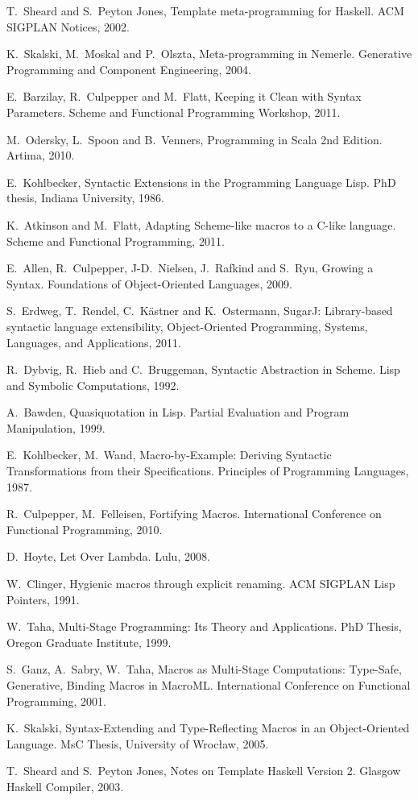 \documentclass[10pt,journal,a4paper]{IEEEtran}
\begin{document}
\begin{thebibliography}{99}

T.~Sheard and S.~Peyton Jones,
Template meta-programming for Haskell.
ACM SIGPLAN Notices, 2002.

K.~Skalski, M.~Moskal and P.~Olszta,
Meta-programming in Nemerle.
Generative Programming and Component Engineering, 2004.

E.~Barzilay, R.~Culpepper and M.~Flatt,
Keeping it Clean with Syntax Parameters.
Scheme and Functional Programming Workshop, 2011.

M.~Odersky, L.~Spoon and B.~Venners,
Programming in Scala 2nd Edition.
Artima, 2010.

E.~Kohlbecker,
Syntactic Extensions in the Programming Language Lisp.
PhD thesis, Indiana University, 1986.

K.~Atkinson and M.~Flatt,
Adapting Scheme-like macros to a C-like language.
Scheme and Functional Programming, 2011.

E.~Allen, R.~Culpepper, J-D.~Nielsen, J.~Rafkind and S.~Ryu,
Growing a Syntax.
Foundations of Object-Oriented Languages, 2009.

S.~Erdweg, T.~Rendel, C.~K\"{a}stner and K.~Ostermann,
SugarJ: Library-based syntactic language extensibility,
Object-Oriented Programming, Systems, Languages, and Applications, 2011.

R.~Dybvig, R.~Hieb and  C.~Bruggeman,
Syntactic Abstraction in Scheme.
Lisp and Symbolic Computations, 1992.

A.~Bawden,
Quasiquotation in Lisp.
Partial Evaluation and Program Manipulation, 1999.

E.~Kohlbecker, M.~Wand,
Macro-by-Example: Deriving Syntactic Transformations from their Specifications.
Principles of Programming Languages, 1987.

R.~Culpepper, M.~Felleisen,
Fortifying Macros.
International Conference on Functional Programming, 2010.

D.~Hoyte,
Let Over Lambda.
Lulu, 2008.

W.~Clinger,
Hygienic macros through explicit renaming.
ACM SIGPLAN Lisp Pointers, 1991.

W.~Taha,
Multi-Stage Programming: Its Theory and Applications.
PhD Thesis, Oregon Graduate Institute, 1999.

S.~Ganz, A.~Sabry, W.~Taha,
Macros as Multi-Stage Computations: Type-Safe, Generative, Binding Macros in MacroML.
International Conference on Functional Programming, 2001.

K.~Skalski,
Syntax-Extending and Type-Reflecting Macros in an Object-Oriented Language.
MsC Thesis, University of Wroc{\l}aw, 2005.

T.~Sheard and S.~Peyton Jones,
Notes on Template Haskell Version 2.
Glasgow Haskell Compiler, 2003.

\end{thebibliography}
\end{document}
